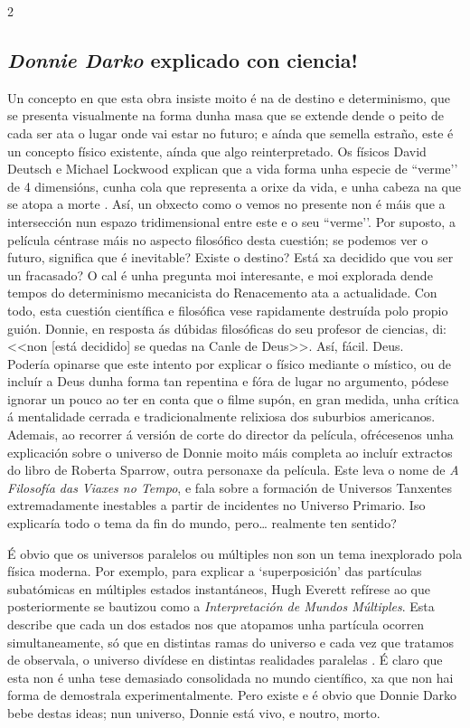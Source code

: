 \begin{refsection}
\begin{multicols}{2}
\subsection*{\textit{Donnie Darko} explicado con ciencia!}

Un concepto en que esta obra insiste moito é na de destino e determinismo, que
se presenta visualmente na forma dunha masa que se extende dende o peito de
cada ser ata o lugar onde vai estar no futuro; e aínda que semella estraño,
este é un concepto físico existente, aínda que algo reinterpretado. Os físicos
David Deutsch e Michael Lockwood explican que a vida forma unha especie de
``verme’' de 4 dimensións, cunha cola que representa a orixe da vida, e unha
cabeza na que se atopa a morte \cite{deutsch.m_1994}. Así, un obxecto como
o vemos no presente non é máis que a intersección nun espazo tridimensional
entre este e o seu ``verme'’.  Por suposto, a película céntrase máis no aspecto
filosófico desta cuestión; se podemos ver o futuro, significa que é inevitable?
Existe o destino? Está xa decidido que vou ser un fracasado? O cal é unha
pregunta moi interesante, e moi explorada dende tempos do determinismo
mecanicista do Renacemento ata a actualidade. Con todo, esta cuestión
científica e filosófica vese rapidamente destruída polo propio guión. Donnie,
en resposta ás dúbidas filosóficas do seu profesor de ciencias, di: <<non [está
decidido] se quedas na Canle de Deus>>\cite{donnie_darko}.
Así, fácil. Deus.\\

Podería opinarse que este intento por explicar o físico mediante o místico, ou
de incluír a Deus dunha forma tan repentina e fóra de lugar no argumento,
pódese ignorar un pouco ao ter en conta que o filme supón, en gran medida,
unha crítica á mentalidade cerrada e tradicionalmente relixiosa dos suburbios
americanos. Ademais, ao recorrer á versión de corte do director da película,
ofrécesenos unha explicación sobre o universo de Donnie moito máis completa ao
incluír extractos do libro de Roberta Sparrow, outra personaxe da película.
Este leva o nome de \textit{A Filosofía das Viaxes no Tempo}, e fala sobre a
formación de Universos Tanxentes extremadamente inestables a partir de
incidentes no Universo Primario. Iso explicaría todo o tema da fin do mundo,
pero… realmente ten sentido?

É obvio que os universos paralelos ou múltiples non son un tema inexplorado
pola física moderna. Por exemplo, para explicar a `superposición’ das
partículas subatómicas en múltiples estados instantáneos, Hugh Everett refírese
ao que posteriormente se bautizou como a \textit{Interpretación de Mundos
Múltiples}. Esta describe que cada un dos estados nos que atopamos unha
partícula ocorren simultaneamente, só que en distintas ramas do universo e cada
vez que tratamos de observala, o universo divídese en distintas realidades
paralelas \cite{gribbin2004historia}. É claro que esta non é unha tese demasiado
consolidada no mundo científico, xa que non hai forma de demostrala
experimentalmente. Pero existe e é obvio que Donnie Darko bebe destas ideas;
nun universo, Donnie está vivo, e noutro, morto.


\end{multicols}
\end{refsection}
